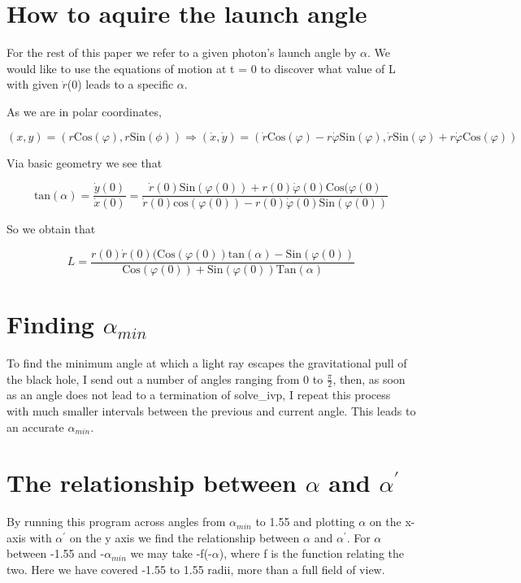 \documentclass[oneside,openright,frontopenright]{dmathesis}
\begin{document}
\section{How to aquire the launch angle}

	For the rest of this paper we refer to a given photon's launch angle by $\alpha$. We would like to use the equations of motion at t = 0 to discover what value of L with given $\dot{r}$(0) leads to a specific $\alpha$.

	As we are in polar coordinates, 

			\[(x, y) = (r\mbox{Cos}(\varphi), r\mbox{Sin}(\phi)) \Rightarrow (\dot{x}, \dot{y}) = (\dot{r}\mbox{Cos}(\varphi) - r\dot{\varphi}\mbox{Sin}(\varphi), \dot{r}\mbox{Sin}(\varphi) + r\dot{\varphi}\mbox{Cos}(\varphi))\]
	
	Via basic geometry we see that 
			
			\[\mbox{tan}(\alpha) = \frac{\dot{y}(0)}{\dot{x}(0)} = \frac{\dot{r}(0)\mbox{Sin}(\varphi(0)) + r(0)\dot{\varphi}(0)\mbox{Cos}(\varphi(0)}{\dot{r}(0)\mbox{cos}(\varphi(0)) - r(0)\dot{\varphi}(0)\mbox{Sin}(\varphi(0))}\]

	So we obtain that 

			\[ L = \frac{r(0)\dot{r}(0)(\mbox{Cos}(\varphi(0))\mbox{tan}(\alpha)-\mbox{Sin}(\varphi(0))}{\mbox{Cos}(\varphi(0))+\mbox{Sin}(\varphi(0))\mbox{Tan}(\alpha)}\]

\section{Finding $\alpha_{min}$}
	
	To find the minimum angle at which a light ray escapes the gravitational pull of the black hole, I send out a number of angles ranging from 0 to $\frac{\pi}{2}$, then, as soon as an angle does not lead to a termination of solve\_ivp, I repeat this process with much smaller intervals between the previous and current angle. This leads to an accurate $\alpha_{min}$.

\section{The relationship between $\alpha$ and $\alpha^{'}$}

	By running this program across angles from $\alpha_{min}$ to 1.55 and plotting $\alpha$ on the x-axis with $\alpha^{'}$ on the y axis we find the relationship between $\alpha$ and $\alpha^{'}$. For $\alpha$ between -1.55 and -$\alpha_{min}$ we may take -f(-$\alpha$), where f is the function relating the two. Here we have covered -1.55 to 1.55 radii, more than a full field of view.
\end{document}
